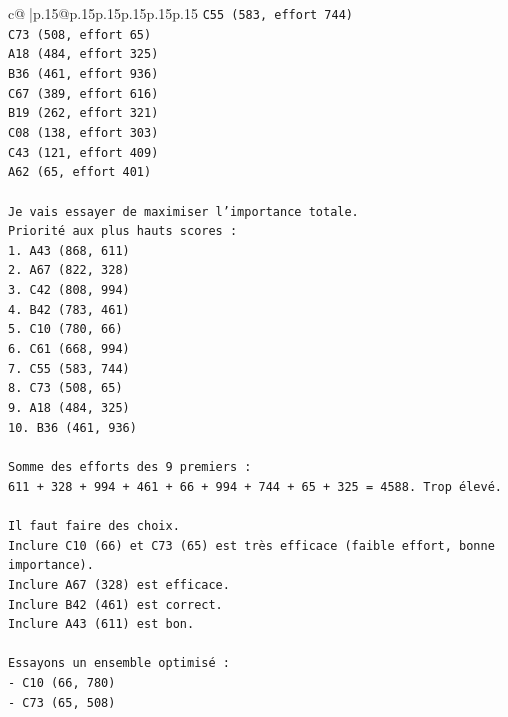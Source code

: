 \documentclass{article}
\begin{document}
{\begin{supertabular}{c@{$\;$}|p{.15\linewidth}@{}p{.15\linewidth}p{.15\linewidth}p{.15\linewidth}p{.15\linewidth}p{.15\linewidth}}
{{{\texttt{C55 (583, effort 744)} \\
\texttt{C73 (508, effort 65)} \\
\texttt{A18 (484, effort 325)} \\
\texttt{B36 (461, effort 936)} \\
\texttt{C67 (389, effort 616)} \\
\texttt{B19 (262, effort 321)} \\
\texttt{C08 (138, effort 303)} \\
\texttt{C43 (121, effort 409)} \\
\texttt{A62 (65, effort 401)} \\
\\ 
\texttt{Je vais essayer de maximiser l'importance totale.} \\
\texttt{Priorité aux plus hauts scores :} \\
\texttt{1. A43 (868, 611)} \\
\texttt{2. A67 (822, 328)} \\
\texttt{3. C42 (808, 994)} \\
\texttt{4. B42 (783, 461)} \\
\texttt{5. C10 (780, 66)} \\
\texttt{6. C61 (668, 994)} \\
\texttt{7. C55 (583, 744)} \\
\texttt{8. C73 (508, 65)} \\
\texttt{9. A18 (484, 325)} \\
\texttt{10. B36 (461, 936)} \\
\\ 
\texttt{Somme des efforts des 9 premiers :} \\
\texttt{611 + 328 + 994 + 461 + 66 + 994 + 744 + 65 + 325 = 4588. Trop élevé.} \\
\\ 
\texttt{Il faut faire des choix.} \\
\texttt{Inclure C10 (66) et C73 (65) est très efficace (faible effort, bonne importance).} \\
\texttt{Inclure A67 (328) est efficace.} \\
\texttt{Inclure B42 (461) est correct.} \\
\texttt{Inclure A43 (611) est bon.} \\
\\ 
\texttt{Essayons un ensemble optimisé :} \\
\texttt{{-} C10 (66, 780)} \\
\texttt{{-} C73 (65, 508)} \\
}}}
\end{supertabular}}
\end{document}
